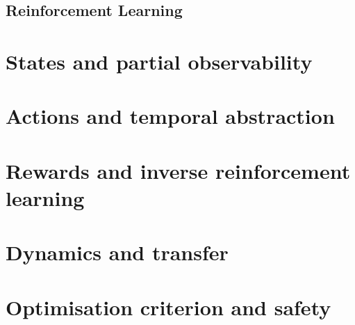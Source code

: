 \subsection{Reinforcement Learning}
\section{States and partial observability}
\section{Actions and temporal abstraction}
\section{Rewards and inverse reinforcement learning}
\section{Dynamics and transfer}
\section{Optimisation criterion and safety}
